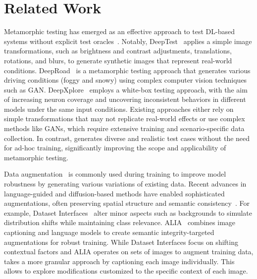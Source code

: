\section{Related Work}
\label{sec:related}

Metamorphic testing has emerged as an effective approach to test DL-based systems without explicit test oracles~\cite{DBLP:conf/icse/ZhouLKGZ0Z020, DBLP:journals/pacmse/ChenJYGZC24}.
Notably, DeepTest~\cite{DBLP:conf/icse/TianPJR18} applies a simple image transformations, such as brightness and contrast adjustments, translations, rotations, and blurs, to generate synthetic images that represent real-world conditions. DeepRoad~\cite{DBLP:conf/kbse/ZhangZZ0K18} is a metamorphic testing approach that generates various driving conditions (foggy and snowy) using complex computer vision techniques such as GAN.
DeepXplore~\cite{DBLP:journals/cacm/PeiCYJ19} employs a white-box testing approach, with the aim of increasing neuron coverage and uncovering inconsistent behaviors in different models under the same input conditions. 
Existing approaches either rely on simple transformations that may not replicate real-world effects or use complex methods like GANs, which require extensive training and scenario-specific data collection. In contrast, \approach generates diverse and realistic test cases without the need for ad-hoc training, significantly improving the scope and applicability of metamorphic testing.

Data augmentation~\cite{DBLP:journals/corr/abs-2407-04103} is commonly used during training to improve model robustness by generating various variations of existing data. Recent advances in language-guided and diffusion-based methods have enabled sophisticated augmentations, often preserving spatial structure and semantic consistency~\cite{DBLP:journals/corr/abs-2409-13661,DBLP:conf/icst/LambertenghiS24}. For example, Dataset Interfaces~\cite{DBLP:journals/corr/abs-2302-07865} alter minor aspects such as backgrounds to simulate distribution shifts while maintaining class relevance. ALIA~\cite{DBLP:conf/nips/DunlapUZYGD23} combines image captioning and language models to create semantic integrity-targeted augmentations for robust training. While Dataset Interfaces focus on shifting contextual factors and ALIA operates on sets of images to augment training data, \approach takes a more granular approach by captioning each image individually. This allows \approach to explore modifications customized to the specific context of each image.